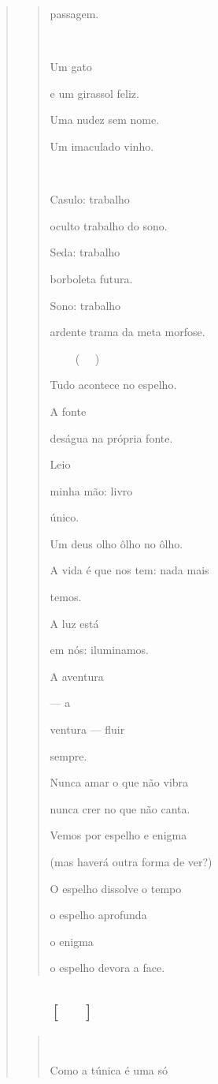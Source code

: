 \begin{verse}
\begin{quote}
passagem.



Um gato

e um girassol feliz.

Uma nudez sem nome.

Um imaculado vinho.



Casulo: trabalho

oculto trabalho do sono.

Seda: trabalho

borboleta futura.

Sono: trabalho

ardente trama da meta morfose.

 ()

Tudo acontece no espelho.

A fonte

deságua na própria fonte.

Leio

minha mão: livro

único.

Um deus olho ôlho no ôlho.

A vida é que nos tem: nada mais

temos.

A luz está

em nós: iluminamos.

A aventura

--- a

ventura --- fluir

sempre.

Nunca amar o que não vibra

nunca crer no que não canta.

Vemos por espelho e enigma

(mas haverá outra forma de ver?)

O espelho dissolve o tempo

o espelho aprofunda

o enigma

o espelho devora a face.
\end{quote}

\subsection{ {[}{]}}\label{section-14}

\begin{quote}


Como a túnica é uma só


\end{quote}
\end{verse}
